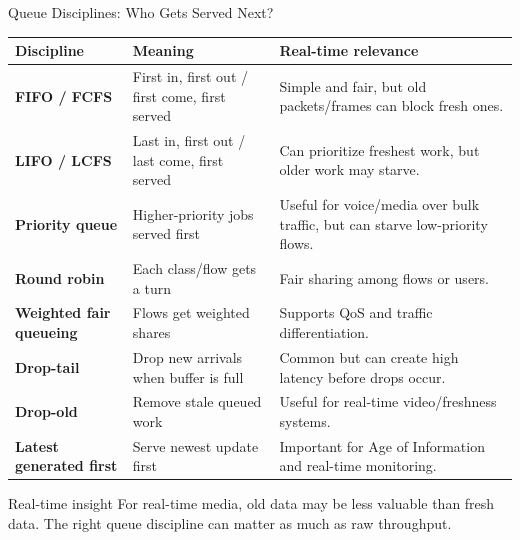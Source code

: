 \documentclass[aspectratio=169]{beamer}
\begin{document}
\begin{frame}{Queue Disciplines: Who Gets Served Next?}
\scriptsize

\begin{tabular}{p{2.4cm} p{3.4cm} p{6.2cm}}
\toprule
\textbf{Discipline} & \textbf{Meaning} & \textbf{Real-time relevance} \\
\midrule
\textbf{FIFO / FCFS} & First in, first out / first come, first served & Simple and fair, but old packets/frames can block fresh ones. \\
\textbf{LIFO / LCFS} & Last in, first out / last come, first served & Can prioritize freshest work, but older work may starve. \\
\textbf{Priority queue} & Higher-priority jobs served first & Useful for voice/media over bulk traffic, but can starve low-priority flows. \\
\textbf{Round robin} & Each class/flow gets a turn & Fair sharing among flows or users. \\
\textbf{Weighted fair queueing} & Flows get weighted shares & Supports QoS and traffic differentiation. \\
\textbf{Drop-tail} & Drop new arrivals when buffer is full & Common but can create high latency before drops occur. \\
\textbf{Drop-old} & Remove stale queued work & Useful for real-time video/freshness systems. \\
\textbf{Latest generated first} & Serve newest update first & Important for Age of Information and real-time monitoring. \\
\bottomrule
\end{tabular}

\vspace{0.15cm}

\begin{alertblock}{Real-time insight}
For real-time media, old data may be less valuable than fresh data. The right queue discipline can matter as much as raw throughput.
\end{alertblock}

\end{frame}
\end{document}
